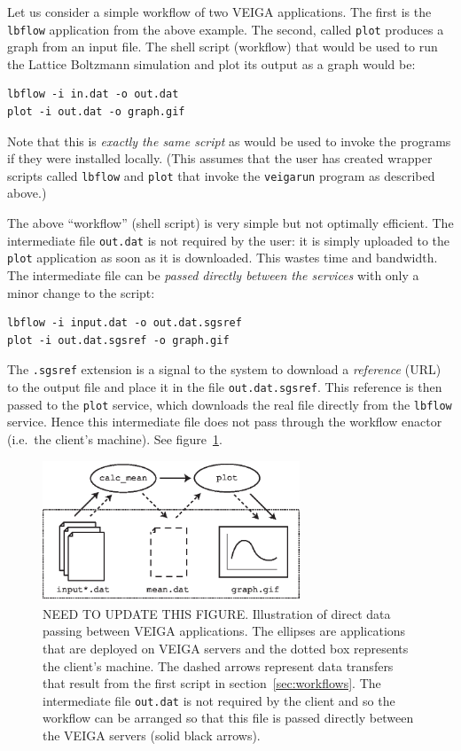 \documentclass[a4paper]{article}
\begin{document}
\begin{multicols}{2}
Let us consider a simple workflow of two VEIGA applications.  The first is the {\tt lbflow} application from the above example.  The second, called {\tt plot} produces a graph from an input file.  The shell script (workflow) that would be used to run the Lattice Boltzmann simulation and plot its output as a graph would be:

\begin{verbatim}
lbflow -i in.dat -o out.dat
plot -i out.dat -o graph.gif
\end{verbatim}

Note that this is {\em exactly the same script\/} as would be used to invoke the programs if they were installed locally.  (This assumes that the user has created wrapper scripts called {\tt lbflow} and {\tt plot} that invoke the {\tt veigarun} program as described above.)

The above ``workflow'' (shell script) is very simple but not optimally efficient.  The intermediate file {\tt out.dat} is not required by the user: it is simply uploaded to the {\tt plot} application as soon as it is downloaded.  This wastes time and bandwidth.  The intermediate file can be {\em passed directly between the services\/} with only a minor change to the script:

\begin{verbatim}
lbflow -i input.dat -o out.dat.sgsref
plot -i out.dat.sgsref -o graph.gif
\end{verbatim}

The {\tt .sgsref} extension is a signal to the system to download a {\em reference\/} (URL) to the output file and place it in the file {\tt out.dat.sgsref}.  This reference is then passed to the {\tt plot} service, which downloads the real file directly from the {\tt lbflow} service.  Hence this intermediate file does not pass through the workflow enactor (i.e.\ the client's machine).  See figure~\ref{fig:datapassing}.

\begin{figure}
\centering
\includegraphics[height=4.2cm]{datapassing.eps}
\caption{NEED TO UPDATE THIS FIGURE. Illustration of direct data passing between VEIGA applications.  The ellipses are applications that are deployed on VEIGA servers and the dotted box represents the client's machine.  The dashed arrows represent data transfers that result from the first script in section~\ref{sec:workflows}.  The intermediate file {\tt out.dat} is not required by the client and so the workflow can be arranged so that this file is passed directly between the VEIGA servers (solid black arrows).}\label{fig:datapassing}
\end{figure}


\end{multicols}
\end{document}
